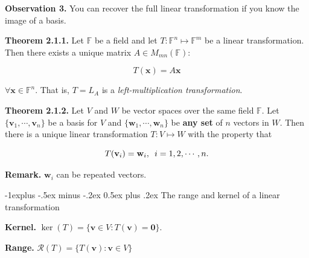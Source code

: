 \documentclass[10pt,landscape]{article}
\makeatletter
\renewcommand{\subsection}{\@startsection{subsection}{2}{0mm}%
                                {-1explus -.5ex minus -.2ex}%
                                {0.5ex plus .2ex}%
                                {\normalfont\normalsize\bfseries}}
\makeatother
\begin{document}
\begin{multicols}{4}
\textbf{Observation 3.} You can recover the full linear transformation if you know the image of a basis.





\textbf{Theorem 2.1.1.} Let $\mathbb{F}$ be a field and let $T : \mathbb{F}^n \mapsto \mathbb{F}^m$ be a linear transformation. Then there exists a unique matrix $A \in M_{mn}(\mathbb{F}):$

$$
T(\mathbf{x}) = A \mathbf{x}
$$

$\forall \mathbf{x} \in \mathbb{F}^n$. That is, $T = L_A$ is a \textit{left-multiplication transformation}.

\textbf{Theorem 2.1.2.} Let $V$ and $W$ be vector spaces over the same field $\mathbb{F}$. Let $\{ \mathbf{v}_1, \cdots, \mathbf{v}_n \}$ be a basis for $V$ and $\{ \mathbf{w}_1, \cdots, \mathbf{w}_n \}$ be \textbf{any set} of $n$ vectors in $W$. Then there is a unique linear transformation $T : V \mapsto W$ with the property that 

$$
T(\mathbf{v}_i) = \mathbf{w}_i, \enskip i = 1, 2, \cdots, n.
$$

\textbf{Remark.} $\mathbf{w}_i$ can be repeated vectors.

\subsection{The range and kernel of a linear transformation}

\textbf{Kernel.} $\ker (T) = \{ \mathbf{v} \in V : T( \mathbf{v}) = \mathbf{0} \}$.

\textbf{Range.} $\mathcal{R}(T) = \{ T(\mathbf{v}) : \mathbf{v} \in V \}$






\end{multicols}
\end{document}

